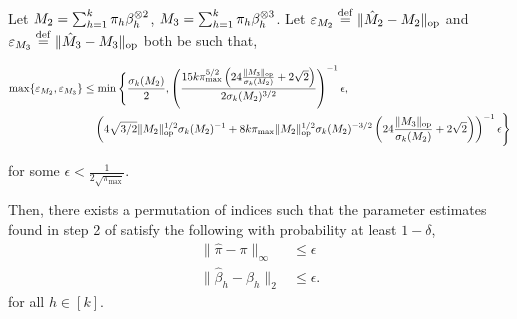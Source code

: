 \begin{lemma}
  \label{lem:app:tensorPower} 
  Let $M_2 = \sum_{h=1}^{k} \pi_h \beta_h^{\otimes 2}$,
  $M_3 = \sum_{h=1}^{k} \pi_h \beta_h^{\otimes 3}$.
  Let $\varepsilon_{M_2} \stackrel{\rm def}{=} \|\hat M_2 - M_2\|_{\text{\rm op}}$ and
  $\varepsilon_{M_3} \stackrel{\rm def}{=} \|\hat M_3 - M_3\|_{\text{\rm op}}$ both be such that,

\begin{align*}
  \max\{\varepsilon_{M_2}, \varepsilon_{M_3}\} &\le \min\Bigg\{
    \frac{\sigma_k(M_2)}{2},
      \left(\frac{15 k \pi_{\max}^{5/2}
      \left(24 \frac{\| {M_3} \|_{\text{\rm op}}}{\sigma_k(M_2)} + 2\sqrt{2} \right)}{2\sigma_k(M_2)^{3/2}} \right)^{-1} \epsilon,\\
     &\quad 
      \left(
      4\sqrt{3/2} \|M_2\|_{\text{\rm op}}^{1/2} \sigma_k(M_2)^{-1} + 8 k \pi_{\max} 
      \|M_2\|_{\text{\rm op}}^{1/2} \sigma_k(M_2)^{-3/2}
      \left(24 \frac{\| {M_3} \|_{\text{\rm op}}}{\sigma_k(M_2)} + 2\sqrt{2} \right) \right)^{-1} \epsilon
  \Bigg\}
\end{align*}
  
for some $\epsilon < \frac{1}{2\sqrt{\pi_{\max}}}$.

  Then, there exists a permutation of indices such that  the parameter
  estimates found in step 2 of 
  \iftoggle{withappendix}{%
  \algorithmref{algo:spectral-experts}
  }{%
  \citet[Algorithm 1]{ChagantyLiang2013}
  }
  satisfy the following with probability at least $1 - \delta$,
  \begin{align*}
  \|\hat \pi - \pi \|_{\infty} &\le \epsilon \\
  \|\hat \beta_h - \beta_h\|_2 &\le \epsilon.
  \end{align*}
  for all $h \in [k]$.
\end{lemma}

